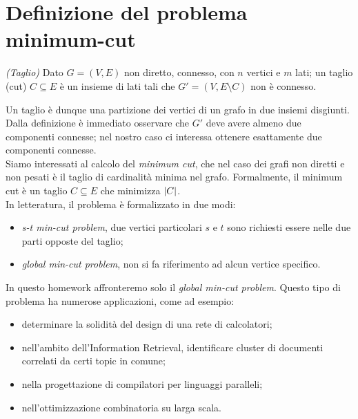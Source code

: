 \section{Definizione del problema minimum-cut}
\label{cap:problem-definition}





\begin{defn}{\emph{(Taglio)}}
  Dato $G = (V,E)$ non diretto, connesso, con $n$ vertici e $m$ lati;
  un taglio (cut) $C \subseteq E$ è un insieme di lati tali che $G' =
  (V, E \setminus C)$ non è connesso.
\end{defn}

\noindent Un taglio è dunque una partizione dei vertici di un grafo in due insiemi disgiunti. Dalla definizione è immediato osservare che $G'$ deve avere
almeno due componenti connesse; nel nostro caso ci interessa
ottenere esattamente due componenti connesse. \\

\noindent Siamo interessati al calcolo del \textit{minimum cut}, che nel caso dei grafi non diretti e non pesati è il taglio di cardinalità minima nel grafo. Formalmente, il minimum cut è un taglio $C \subseteq E$ che minimizza $\abs{C}$.\\

\noindent In letteratura, il problema è formalizzato in due modi:

\begin{itemize}
    \item \textit{s-t min-cut problem}, due vertici particolari $s$ e
      $t$ sono richiesti essere nelle due parti opposte del taglio;
    \item \textit{global min-cut problem}, non si fa riferimento ad
      alcun vertice specifico.
\end{itemize}

\noindent In questo homework affronteremo solo il \textit{global
  min-cut problem}. Questo tipo di problema ha numerose applicazioni, come ad esempio:

\begin{itemize}
    \item determinare la solidità del design di una rete di
      calcolatori;
    \item nell'ambito dell'Information Retrieval, identificare cluster
      di documenti correlati da certi topic in comune;
    \item nella progettazione di compilatori per linguaggi paralleli;
    \item nell'ottimizzazione combinatoria su larga scala.
\end{itemize}
